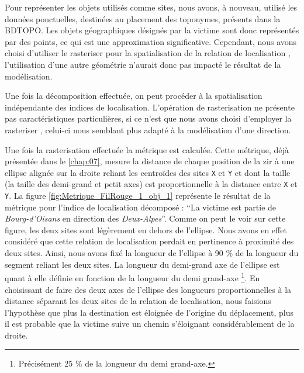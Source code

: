 Pour représenter les objets utilisés comme sites, nous avons, à
nouveau, utilisé les données ponctuelles, destinées au placement des
toponymes, présents dans la BDTOPO. Les objets géographiques désignés
par la victime sont donc représentés par des points, ce qui est une
approximation significative. Cependant, nous avons choisi d'utiliser
le rasteriser  pour la spatialisation de la
relation de localisation
, l'utilisation d'une
autre géométrie n'aurait donc pas impacté le résultat de la
modélisation.

Une fois la décomposition effectuée, on peut procéder à la
spatialisation indépendante des indices de localisation. L'opération
de rasterisation ne présente pas caractéristiques particulières, si ce
n'est que nous avons choisi d'employer la rasteriser
, celui-ci nous semblant plus adapté à la
modélisation d'une direction.

Une fois la rasterisation effectuée la métrique
 est calculée. Cette métrique, déjà
présentée dans le \autoref{chap:07}, mesure la distance de chaque
position de la \ac{zir} à une ellipse alignée sur la droite reliant
les centroïdes des sites \texttt{X} et \texttt{Y} et dont la taille
(\ie la taille des demi-grand et petit axes) est proportionnelle à la
distance entre \texttt{X} et \texttt{Y}. La figure
\ref{fig:Metrique_FilRouge_1_obj_1} représente le résultat de la
métrique pour l'indice de localisation décomposé : \enquote{La victime
  est partie de \emph{Bourg-d'Oisans} en direction des
  \emph{Deux-Alpes}}. Comme on peut le voir sur cette figure, les deux
sites sont légèrement en dehors de l'ellipse. Nous avons en effet
considéré que cette relation de localisation perdait en pertinence à
proximité des deux sites. Ainsi, nous avons fixé la longueur de
l'ellipse à 90 \% de la longueur du segment reliant les deux sites. La
longueur du demi-grand axe de l'ellipse est quant à elle définie en
fonction de la longueur du demi grand-axe \footnote{Précisément 25 \%
  de la longueur du demi grand-axe.}. En choisissant de faire des deux
axes de l'ellipse des longueurs proportionnelles à la distance
séparant les deux sites de la relation de localisation, nous faisions
l'hypothèse que plus la destination est éloignée de l'origine du
déplacement, plus il est probable que la victime suive un chemin
s'éloignant considérablement de la droite.

